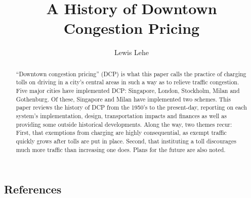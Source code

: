 \documentclass[authoryear]{elsarticle}
\begin{document}
\title{A History of Downtown Congestion Pricing}
\author[ll]{Lewis Lehe }

\address[ll]{UC Berkeley, Department of Civil and Environmental Engineering \\ lewis500@berkeley.edu \\ http://lewislehe.com}

\begin{abstract}

``Downtown congestion pricing'' (DCP) is what this paper calls the practice of charging tolls on driving in a city's central areas in such a way as to relieve traffic congestion. Five major cities have implemented DCP: Singapore, London, Stockholm, Milan and Gothenburg. Of these, Singapore and Milan have implemented two schemes. This paper reviews the history of DCP from the 1950's to the present-day, reporting on each system's implementation, design, transportation impacts and finances as well as providing some outside historical developments. Along the way, two themes recur: First, that exemptions from charging are highly consequential, as exempt traffic quickly grows after tolls are put in place. Second, that instituting a toll discourages much more traffic than increasing one does. Plans for the future are also noted. 

\end{abstract}

\maketitle













\pagebreak
\subsection*{References}


\end{document}
